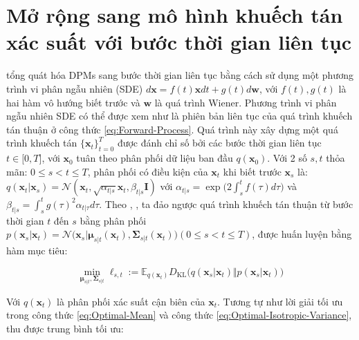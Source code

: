 \documentclass[14pt, a4paper]{article}
\numberwithin{equation}{section}
\numberwithin{figure}{section}
\numberwithin{dl}{section}
\numberwithin{md}{section}
\numberwithin{bd}{section}
\numberwithin{dn}{section}
\numberwithin{hq}{section}
\begin{document}
    \section{Mở rộng sang mô hình khuếch tán xác suất với bước thời gian liên tục} \label{Extension-to-DPMs-with-Continuous-Timesteps}

    \cite{song2020score} tổng quát hóa DPMs sang bước thời gian liên tục bằng cách sử dụng một phương trình vi phân ngẫu nhiên (SDE) $d \boldsymbol{x}=f(t) \boldsymbol{x} dt + g(t) d \boldsymbol{w}$,
    với $f(t), g(t)$ là hai hàm vô hướng biết trước và $\boldsymbol{w}$ là quá trình Wiener.
    Phương trình vi phân ngẫu nhiên SDE có thể được xem như là phiên bản liên tục của quá trình khuếch tán thuận ở công thức \ref{eq:Forward-Process}.
    Quá trình này xây dựng một quá trình khuếch tán $\lbrace \boldsymbol{x}_t \rbrace_{t=0}^T$ được đánh chỉ số bởi các bước thời gian liên tục $t \in \lbrack 0, T \rbrack$,
    với $\boldsymbol{x}_0$ tuân theo phân phối dữ liệu ban đầu $q(\boldsymbol{x}_0)$.
    Với 2 số $s, t$ thỏa mãn: $0 \leq s < t \leq T$, phân phối có điều kiện của $\boldsymbol{x}_t$ khi biết trước $\boldsymbol{x}_s$ là: $q(\boldsymbol{x}_t \vert \boldsymbol{x}_s)=\mathcal{N}(\boldsymbol{x}_t, \sqrt{\alpha_{t \vert s}} \boldsymbol{x}_t, \beta_{t \vert s} \boldsymbol{I})$ với $\alpha_{t \vert s}=\exp\Big(2\displaystyle\int_{s}^{t} f(\tau)d \tau \Big)$ và $\beta_{t \vert s}= \displaystyle\int_{s}^{t} g(\tau)^2 \alpha_{t \vert \tau} d \tau$.
    Theo \cite{bao2021analytic}, \cite{kingma2021variational}, ta đảo ngược quá trình khuếch tán thuận từ bước thời gian $t$ đến $s$ bằng phân phối $p(\boldsymbol{x}_s \vert \boldsymbol{x}_t) = \mathcal{N}\big( \boldsymbol{x}_s \vert \boldsymbol{\mu}_{s \vert t} (\boldsymbol{x}_t), \boldsymbol{\Sigma}_{s \vert t} (\boldsymbol{x}_t) \big) (0 \leq s < t \leq T)$, được huấn luyện bằng hàm mục tiêu:

    \begin{equation}
        \min_{\boldsymbol{\mu}_{s \vert t}, \boldsymbol{\Sigma}_{s \vert t}} \ell_{s, t} := \mathbb{E}_{q(\boldsymbol{x}_t)} D_{\mathrm{KL}} \big( q(\boldsymbol{x}_s \vert \boldsymbol{x}_t) \Vert p(\boldsymbol{x}_s \vert \boldsymbol{x}_t) \big)
    \end{equation}
    
    Với $q(\boldsymbol{x}_t)$ là phân phối xác suất cận biên của $\boldsymbol{x}_t$. Tương tự như lời giải tối ưu trong công thức \ref{eq:Optimal-Mean} và công thức \ref{eq:Optimal-Isotropic-Variance}, \cite{bao2021analytic} thu được trung bình tối ưu:
\end{document}
